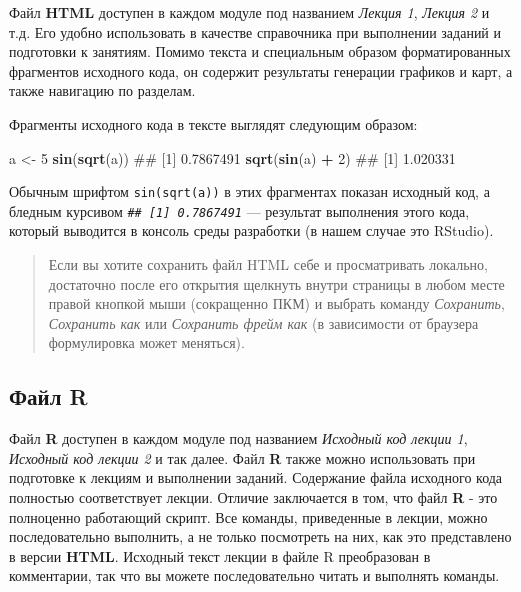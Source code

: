 \documentclass[]{book}
\newenvironment{Shaded}{\begin{snugshade}}{\end{snugshade}}
\newcommand{\KeywordTok}[1]{\textcolor[rgb]{0.13,0.29,0.53}{\textbf{#1}}}
\newcommand{\DecValTok}[1]{\textcolor[rgb]{0.00,0.00,0.81}{#1}}
\newcommand{\StringTok}[1]{\textcolor[rgb]{0.31,0.60,0.02}{#1}}
\newcommand{\OperatorTok}[1]{\textcolor[rgb]{0.81,0.36,0.00}{\textbf{#1}}}
\newcommand{\NormalTok}[1]{#1}
\begin{document}
Файл \textbf{HTML} доступен в каждом модуле под названием \emph{Лекция
1}, \emph{Лекция 2} и т.д. Его удобно использовать в качестве
справочника при выполнении заданий и подготовки к занятиям. Помимо
текста и специальным образом форматированных фрагментов исходного кода,
он содержит результаты генерации графиков и карт, а также навигацию по
разделам.

Фрагменты исходного кода в тексте выглядят следующим образом:

\begin{Shaded}
\begin{Highlighting}[]
\NormalTok{a <-}\StringTok{ }\DecValTok{5}
\KeywordTok{sin}\NormalTok{(}\KeywordTok{sqrt}\NormalTok{(a))}
\NormalTok{## [1] 0.7867491}
\KeywordTok{sqrt}\NormalTok{(}\KeywordTok{sin}\NormalTok{(a) }\OperatorTok{+}\StringTok{ }\DecValTok{2}\NormalTok{)}
\NormalTok{## [1] 1.020331}
\end{Highlighting}
\end{Shaded}

Обычным шрифтом \texttt{sin(sqrt(a))} в этих фрагментах показан исходный
код, а бледным курсивом \emph{\texttt{\#\#\ {[}1{]}\ 0.7867491}} ---
результат выполнения этого кода, который выводится в консоль среды
разработки (в нашем случае это RStudio).

\begin{quote}
Если вы хотите сохранить файл HTML себе и просматривать локально,
достаточно после его открытия щелкнуть внутри страницы в любом месте
правой кнопкой мыши (сокращенно ПКМ) и выбрать команду \emph{Сохранить},
\emph{Сохранить как} или \emph{Сохранить фрейм как} (в зависимости от
браузера формулировка может меняться).
\end{quote}

\subsection*{Файл R}\label{-r}

Файл \textbf{R} доступен в каждом модуле под названием \emph{Исходный
код лекции 1}, \emph{Исходный код лекции 2} и так далее. Файл \textbf{R}
также можно использовать при подготовке к лекциям и выполнении заданий.
Содержание файла исходного кода полностью соответствует лекции. Отличие
заключается в том, что файл \textbf{R} - это полноценно работающий
скрипт. Все команды, приведенные в лекции, можно последовательно
выполнить, а не только посмотреть на них, как это представлено в версии
\textbf{HTML}. Исходный текст лекции в файле R преобразован в
комментарии, так что вы можете последовательно читать и выполнять
команды.
\end{document}
